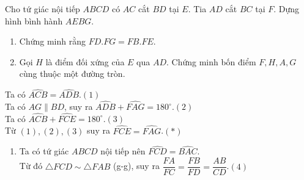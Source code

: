 \begin{ex}%
Cho tứ giác nội tiếp $ABCD$ có $AC$ cắt $BD$ tại $E$. Tia $AD$ cắt $BC$ tại $F$. Dựng hình bình hành  $AEBG$.
    \begin{enumerate}
        \item Chứng minh rằng $FD.FG=FB.FE$.
        \item Gọi $H$ là điểm đối xứng của $E$ qua $AD$. Chứng minh bốn điểm $F, H, A, G$ cùng thuộc một đường tròn.
    \end{enumerate}
\loigiai
    {
Ta có $\widehat {ACB}=\widehat {ADB}$.\hfill$(1)$\\
Ta có $AG \parallel BD$, suy ra $\widehat {ADB} +\widehat {FAG}=180^\circ$.\hfill$(2)$\\
Ta có $\widehat {ACB} +\widehat {FCE}=180^\circ$.\hfill$(3)$\\
Từ $(1), (2), (3)$ suy ra $\widehat {FCE}=\widehat {FAG}$.\hfill$(*)$
\begin{center}
    \end{center}
    \begin{enumerate}
      \item Ta có tứ giác $ABCD$ nội tiếp nên $\widehat {FCD}=\widehat {BAC}$.\\
      Từ đó $\triangle FCD \sim \triangle FAB$ (g-g), suy ra $\dfrac{FA}{FC}=\dfrac{FB}{FD}=\dfrac{AB}{CD}$.\hfill$(4)$\\

\end{enumerate}}
\end{ex}
